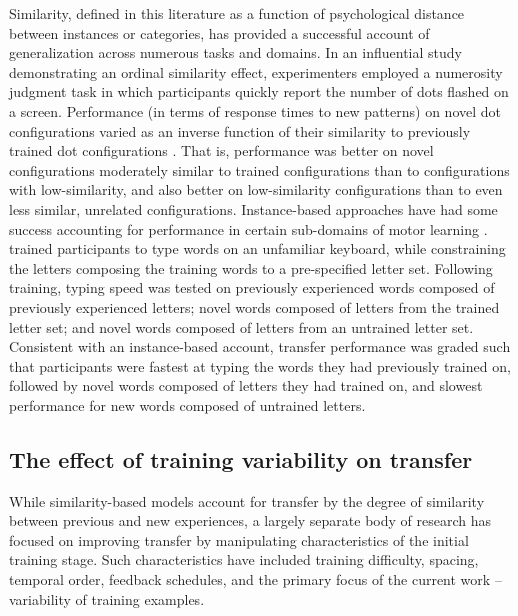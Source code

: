 \documentclass[
  12pt,
  letterpaper,
]{article}
\begin{document}
Similarity, defined in this literature as a function of psychological
distance between instances or categories, has provided a successful
account of generalization across numerous tasks and domains. In an
influential study demonstrating an ordinal similarity effect,
experimenters employed a numerosity judgment task in which participants
quickly report the number of dots flashed on a screen. Performance (in
terms of response times to new patterns) on novel dot configurations
varied as an inverse function of their similarity to previously trained
dot configurations \textcite{palmeriExemplarSimilarityDevelopment1997}.
That is, performance was better on novel configurations moderately
similar to trained configurations than to configurations with
low-similarity, and also better on low-similarity configurations than to
even less similar, unrelated configurations. Instance-based approaches
have had some success accounting for performance in certain sub-domains
of motor learning
\autocite{cohenWhereGraspsAre2004,crumpEpisodicContributionsSequential2010,meighWhatMemoryRepresentation2018,poldrackRelationshipSkillLearning1999,wifallReachingResponseSelection2017}.
\textcite{crumpEpisodicContributionsSequential2010} trained participants
to type words on an unfamiliar keyboard, while constraining the letters
composing the training words to a pre-specified letter set. Following
training, typing speed was tested on previously experienced words
composed of previously experienced letters; novel words composed of
letters from the trained letter set; and novel words composed of letters
from an untrained letter set. Consistent with an instance-based account,
transfer performance was graded such that participants were fastest at
typing the words they had previously trained on, followed by novel words
composed of letters they had trained on, and slowest performance for new
words composed of untrained letters.

\subsection{The effect of training variability on
transfer}\label{the-effect-of-training-variability-on-transfer}

While similarity-based models account for transfer by the degree of
similarity between previous and new experiences, a largely separate body
of research has focused on improving transfer by manipulating
characteristics of the initial training stage. Such characteristics have
included training difficulty, spacing, temporal order, feedback
schedules, and the primary focus of the current work -- variability of
training examples.
\end{document}

